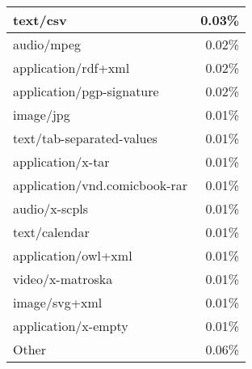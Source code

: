 \begin{multicols}{2}
\begin{center}
\begin{supertabular}[H]{l|r}
		\hline
		text/csv			&	0.03\% \\
		\hline
		audio/mpeg			&	0.02\% \\
		\hline
		application/rdf+xml	&	0.02\% \\
		\hline
		application/pgp-signature		&	0.02\% \\
		\hline
		image/jpg			&	0.01\% \\
		\hline
		text/tab-separated-values		&	0.01\% \\
		\hline
		application/x-tar	&	0.01\% \\
		\hline
		application/vnd.comicbook-rar	&	0.01\% \\
		\hline
		audio/x-scpls		&	0.01\% \\
		\hline
		text/calendar		&	0.01\% \\
		\hline
		application/owl+xml	&	0.01\% \\
		\hline
		video/x-matroska	&	0.01\% \\
		\hline
		image/svg+xml		&	0.01\% \\
		\hline
		application/x-empty	&	0.01\% \\
		\hline
		Other				&	0.06\% \\
		\hline
	\end{supertabular}
	\end{center}
\end{multicols}
\fi

